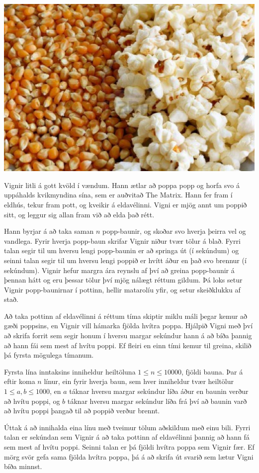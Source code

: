 
\includegraphics[scale=0.4]{popp.jpg}

Vignir litli á gott kvöld í vændum. Hann ætlar að poppa popp og horfa svo á
uppáhalds kvikmyndina sína, sem er auðvitað The Matrix. Hann fer fram í eldhús,
tekur fram pott, og kveikir á eldavélinni. Vigni er mjög annt um poppið sitt,
og leggur sig allan fram við að elda það rétt.

Hann byrjar á að taka saman $n$ popp-baunir, og skoðar svo hverja þeirra vel og
vandlega. Fyrir hverja popp-baun skrifar Vignir niður tvær tölur á blað. Fyrri
talan segir til um hversu lengi popp-baunin er að springa út (í sekúndum) og
seinni talan segir til um hversu lengi poppið er hvítt áður en það svo brennur
(í sekúndum). Vignir hefur margra ára reynslu af því að greina popp-baunir á
þennan hátt og eru þessar tölur því mjög nálægt réttum gildum. Þá loks setur
Vignir popp-baunirnar í pottinn, hellir matarolíu yfir, og setur skeiðklukku af
stað.

Að taka pottinn af eldavélinni á réttum tíma skiptir miklu máli þegar kemur að
gæði poppsins, en Vignir vill hámarka fjölda hvítra poppa. Hjálpið Vigni með
því að skrifa forrit sem segir honum í hversu margar sekúndur hann á að bíða
þannig að hann fái sem mest af hvítu poppi. Ef fleiri en einn tími kemur til
greina, skilið þá fyrsta mögulega tímanum.

Fyrsta lína inntaksins inniheldur heiltöluna $1 \leq n \leq 10000$, fjöldi
bauna. Þar á eftir koma $n$ línur, ein fyrir hverja baun, sem hver inniheldur
tvær heiltölur $1 \leq a,b \leq 1000$, en $a$ táknar hversu margar sekúndur
líða áður en baunin verður að hvítu poppi, og $b$ táknar hversu margar sekúndur
líða frá því að baunin varð að hvítu poppi þangað til að poppið verður brennt.

Úttak á að innihalda eina línu með tveimur tölum aðskildum með einu bili. Fyrri
talan er sekúndan sem Vignir á að taka pottinn af eldavélinni þannig að hann fá
sem mest af hvítu poppi. Seinni talan er þá fjöldi hvítra poppa sem Vignir fær.
Ef mörg svör gefa sama fjölda hvítra poppa, þá á að skrifa út svarið sem lætur
Vigni bíða minnst.

